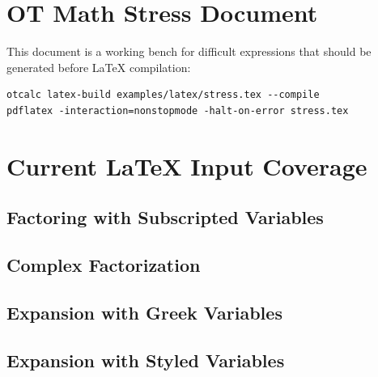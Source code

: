 \documentclass{article}
\begin{document}
\section*{OT Math Stress Document}

This document is a working bench for difficult expressions that should be generated
before LaTeX compilation:

\begin{verbatim}
otcalc latex-build examples/latex/stress.tex --compile
pdflatex -interaction=nonstopmode -halt-on-error stress.tex
\end{verbatim}

\section*{Current LaTeX Input Coverage}

\subsection*{Factoring with Subscripted Variables}


\subsection*{Complex Factorization}


\subsection*{Expansion with Greek Variables}




\subsection*{Expansion with Styled Variables}

\end{document}
